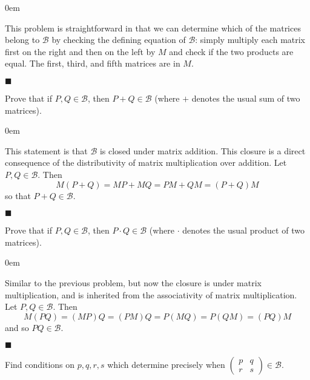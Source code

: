 \documentclass[12pt]{article}
\renewcommand{\qed}{\hfill$\blacksquare$}
\renewenvironment{proof}{\begin{addmargin}[1em]{0em}\begin{newproof}}{\end{newproof}\end{addmargin}\qed}
\newenvironment{problem}[2][Exercise]{\begin{trivlist}
\item[\hskip \labelsep {\bfseries #1}\hskip \labelsep {\bfseries #2.}]}{\end{trivlist}}
\begin{document}
\begin{proof}
This problem is straightforward in that we can determine which of the matrices belong to $\mathcal{B}$ by checking the defining equation of $\mathcal{B}$: simply multiply each matrix first on the right and then on the left by $M$ and check if the two products are equal. The first, third, and fifth matrices are in $M$.
\end{proof}

\begin{problem}{0.1.2}
Prove that if $P,Q\in \mathcal{B}$, then $P+Q\in \mathcal{B}$ (where $+$ denotes the usual sum of two matrices).
\end{problem}

\begin{proof}
This statement is that $\mathcal{B}$ is closed under matrix addition. This closure is a direct consequence of the distributivity of matrix multiplication over addition. Let $P,Q \in \mathcal{B}$. Then
$$ M\left(P+Q\right) = MP + MQ = PM + QM = \left(P+Q\right)M $$ so that $P+Q \in \mathcal{B}$.
\end{proof}





\begin{problem}{0.1.3}
Prove that if $P,Q\in \mathcal{B}$, then $P\cdot Q \in \mathcal{B}$ (where $\cdot$ denotes the usual product of two matrices).
\end{problem}
\begin{proof}
Similar to the previous problem, but now the closure is under matrix multiplication, and is inherited from the associativity of matrix multiplication. Let $P,Q \in \mathcal{B}$. Then
$$ M\left(PQ\right) = \left(MP\right)Q=\left(PM\right)Q = P\left(MQ\right) = P\left(QM\right) = \left(PQ\right)M $$
and so $PQ \in \mathcal{B}$.
\end{proof}




\begin{problem}{0.1.4}
Find conditions on $p,q,r,s$ which determine precisely when $\left( \begin{array}{cc} p & q \\ r & s \end{array}\right) \in \mathcal{B}$.
\end{problem}
\end{document}
